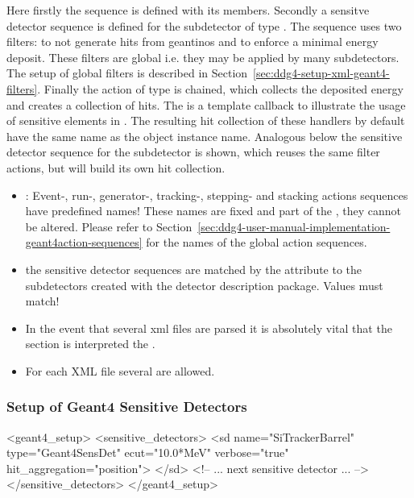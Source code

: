 \documentclass[10pt,a4paper]{article}
\begin{document}
Here firstly the  sequence is defined with its members. 
Secondly a sensitve detector sequence is defined for the subdetector
 of type .
The sequence uses two filters:  to not generate hits
from geantinos and  to enforce a minimal energy deposit.
These filters are global i.e. they may be applied by many subdetectors.
The setup of global filters is described in 
Section~\ref{sec:ddg4-setup-xml-geant4-filters}.
Finally the action  of type 
is chained, which collects the deposited energy and 
creates a collection of hits. The  is a template
callback to illustrate the usage of sensitive elements in \DDG.
The resulting hit collection of these handlers by default have the same name as the
object instance name.
Analogous below the sensitive detector sequence for the subdetector 
 is shown, which reuses the same filter actions, but will build its own
hit collection.

\noindent
{} 
\begin{itemize}\itemcompact
\item {}: Event-, run-, generator-, tracking-,
    stepping- and stacking actions sequences have predefined names! 
    These names are fixed and part of the , they cannot be altered.
    Please refer to 
    Section~\ref{sec:ddg4-user-manual-implementation-geant4action-sequences} 
    for the names of the global action sequences.
\item the sensitive detector sequences are matched by the attribute  to the 
    subdetectors created with the \DDhep detector description package. Values must match!
\item In the event that several xml files are parsed it is absolutely vital that 
    the  section is interpreted  the .
\item For each XML file several  are allowed.
\noindent
\end{itemize}

\subsubsection{Setup of Geant4 Sensitive Detectors}
\label{sec:ddg4-setup-xml-geant4-sensitive detectors}
\begin{code}
  <geant4_setup>
    <sensitive_detectors>
      <sd name="SiTrackerBarrel" 
          type="Geant4SensDet" 
          ecut="10.0*MeV" 
          verbose="true" 
          hit_aggregation="position">
      </sd>
      <!-- ...  next sensitive detector ... -->
    </sensitive_detectors>
  </geant4_setup>
\end{code}
\end{document}
